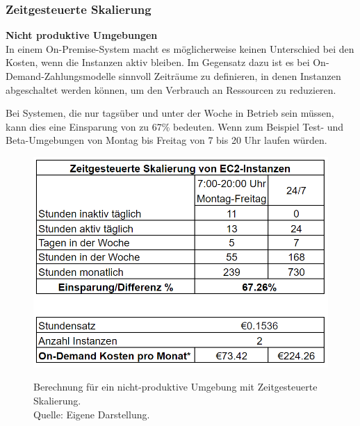 
\subsubsection{Zeitgesteuerte Skalierung}
\textbf{Nicht produktive Umgebungen}\\
In einem On-Premise-System macht es möglicherweise keinen Unterschied bei den Kosten, wenn die Instanzen aktiv bleiben. 
Im Gegensatz dazu ist es bei On-Demand-Zahlungsmodelle sinnvoll Zeiträume zu definieren, in denen Instanzen abgeschaltet werden können, um den Verbrauch an Ressourcen zu reduzieren.

Bei Systemen, die nur tagsüber und unter der Woche in Betrieb sein müssen, kann dies eine Einsparung von zu 67\% bedeuten.  Wenn zum Beispiel Test- und Beta-Umgebungen von Montag bis Freitag von 7 bis 20 Uhr laufen würden.
\begin{figure}[h]
  \centering
  \includegraphics[scale=0.6]{sources/Einsparung_Zeitgesteuerte_Skalierung}
  \caption[Berechnung für ein nicht produktives Umgebung mit Zeitgesteuerte Skalierung]{}
  \label{fig:Einsparung_Zeitgesteuerte_Skalierung} Berechnung für ein nicht-produktive Umgebung mit Zeitgesteuerte Skalierung. \\
  Quelle: Eigene Darstellung. 
\end{figure}
\\
